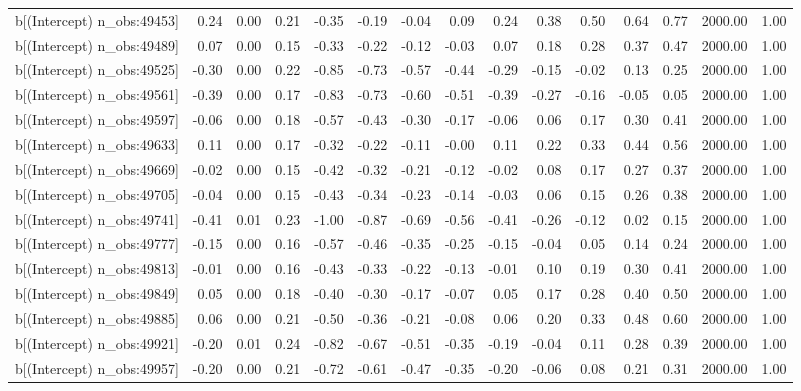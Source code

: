 \begin{table}[ht]
\begin{tabular}{rrrrrrrrrrrrrrr}
  b[(Intercept) n\_obs:49453] & 0.24 & 0.00 & 0.21 & -0.35 & -0.19 & -0.04 & 0.09 & 0.24 & 0.38 & 0.50 & 0.64 & 0.77 & 2000.00 & 1.00 \\ 
  b[(Intercept) n\_obs:49489] & 0.07 & 0.00 & 0.15 & -0.33 & -0.22 & -0.12 & -0.03 & 0.07 & 0.18 & 0.28 & 0.37 & 0.47 & 2000.00 & 1.00 \\ 
  b[(Intercept) n\_obs:49525] & -0.30 & 0.00 & 0.22 & -0.85 & -0.73 & -0.57 & -0.44 & -0.29 & -0.15 & -0.02 & 0.13 & 0.25 & 2000.00 & 1.00 \\ 
  b[(Intercept) n\_obs:49561] & -0.39 & 0.00 & 0.17 & -0.83 & -0.73 & -0.60 & -0.51 & -0.39 & -0.27 & -0.16 & -0.05 & 0.05 & 2000.00 & 1.00 \\ 
  b[(Intercept) n\_obs:49597] & -0.06 & 0.00 & 0.18 & -0.57 & -0.43 & -0.30 & -0.17 & -0.06 & 0.06 & 0.17 & 0.30 & 0.41 & 2000.00 & 1.00 \\ 
  b[(Intercept) n\_obs:49633] & 0.11 & 0.00 & 0.17 & -0.32 & -0.22 & -0.11 & -0.00 & 0.11 & 0.22 & 0.33 & 0.44 & 0.56 & 2000.00 & 1.00 \\ 
  b[(Intercept) n\_obs:49669] & -0.02 & 0.00 & 0.15 & -0.42 & -0.32 & -0.21 & -0.12 & -0.02 & 0.08 & 0.17 & 0.27 & 0.37 & 2000.00 & 1.00 \\ 
  b[(Intercept) n\_obs:49705] & -0.04 & 0.00 & 0.15 & -0.43 & -0.34 & -0.23 & -0.14 & -0.03 & 0.06 & 0.15 & 0.26 & 0.38 & 2000.00 & 1.00 \\ 
  b[(Intercept) n\_obs:49741] & -0.41 & 0.01 & 0.23 & -1.00 & -0.87 & -0.69 & -0.56 & -0.41 & -0.26 & -0.12 & 0.02 & 0.15 & 2000.00 & 1.00 \\ 
  b[(Intercept) n\_obs:49777] & -0.15 & 0.00 & 0.16 & -0.57 & -0.46 & -0.35 & -0.25 & -0.15 & -0.04 & 0.05 & 0.14 & 0.24 & 2000.00 & 1.00 \\ 
  b[(Intercept) n\_obs:49813] & -0.01 & 0.00 & 0.16 & -0.43 & -0.33 & -0.22 & -0.13 & -0.01 & 0.10 & 0.19 & 0.30 & 0.41 & 2000.00 & 1.00 \\ 
  b[(Intercept) n\_obs:49849] & 0.05 & 0.00 & 0.18 & -0.40 & -0.30 & -0.17 & -0.07 & 0.05 & 0.17 & 0.28 & 0.40 & 0.50 & 2000.00 & 1.00 \\ 
  b[(Intercept) n\_obs:49885] & 0.06 & 0.00 & 0.21 & -0.50 & -0.36 & -0.21 & -0.08 & 0.06 & 0.20 & 0.33 & 0.48 & 0.60 & 2000.00 & 1.00 \\ 
  b[(Intercept) n\_obs:49921] & -0.20 & 0.01 & 0.24 & -0.82 & -0.67 & -0.51 & -0.35 & -0.19 & -0.04 & 0.11 & 0.28 & 0.39 & 2000.00 & 1.00 \\ 
  b[(Intercept) n\_obs:49957] & -0.20 & 0.00 & 0.21 & -0.72 & -0.61 & -0.47 & -0.35 & -0.20 & -0.06 & 0.08 & 0.21 & 0.31 & 2000.00 & 1.00 \\ 

\end{tabular}
\end{table}
